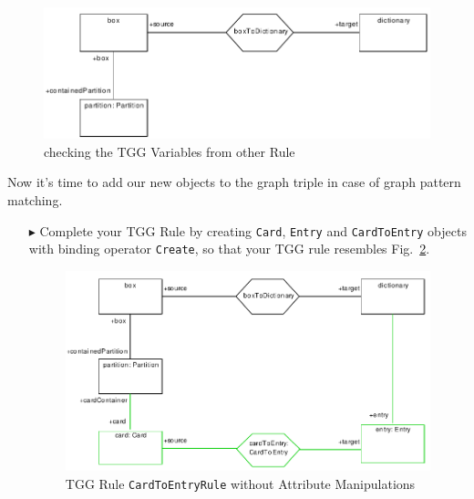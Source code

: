 \begin{enumerate}
\begin{figure}[htbp]
\begin{center}
  \includegraphics[width=\textwidth]{pics/tggBilder/tggRule/tgg18}
  \caption{checking the TGG Variables from other Rule }  
  \label{fig:check_bound_variables}
\end{center}
\end{figure}

\end{enumerate}

Now it's time to add our new objects to the graph triple in case of graph pattern matching. 

\begin{enumerate}
\item[$\blacktriangleright$] Complete your TGG Rule by creating \texttt{Card}, \texttt{Entry} and \texttt{CardToEntry} objects with binding operator \texttt{Create}, so that your TGG rule resembles Fig.~\ref{fig:cardtoentry_1}.

\begin{figure}[htbp]
\begin{center}
  \includegraphics[width=\textwidth]{pics/tggBilder/tggRule/tgg19}
  \caption{TGG Rule \texttt{CardToEntryRule} without Attribute Manipulations}  
  \label{fig:cardtoentry_1}
\end{center}
\end{figure}

\end{enumerate}

